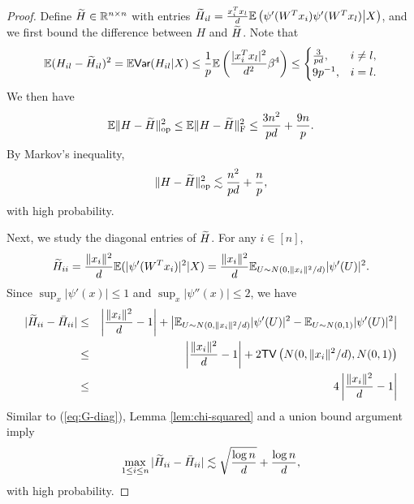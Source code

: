 \begin{proof}
Define $\widetilde{H}\in\mathbb{R}^{n\times n}$ with entries $\widetilde{H}_{il}=\frac{x_i^Tx_l}{d}\mathbb{E}\left(\psi'(W^Tx_i)\psi'(W^Tx_l)\big|X\right)$, and we first bound the difference between $H$ and $\widetilde{H}$. Note that
$$\mathbb{E}(H_{il}-\wt{H}_{il})^2=\mathbb{E}\Var(H_{il}|X)\leq \frac{1}{p}\mathbb{E}\left(\frac{|x_i^Tx_l|^2}{d^2}\beta^4\right)\leq\begin{cases}
\frac{3}{pd}, & i\neq l, \\
9p^{-1}, & i=l.
\end{cases}$$
We then have
$$\mathbb{E}\|H-\widetilde{H}\|_{\rm op}^2 \leq \mathbb{E}\|H-\widetilde{H}\|_{\rm F}^2 \leq \frac{3n^2}{pd} + \frac{9n}{p}.$$
By Markov's inequality,
\begin{equation}
\opnorm{H-\wt{H}}^2 \lesssim \frac{n^2}{pd} + \frac{n}{p}, \label{eq:H-H-tilde}
\end{equation}
with high probability.

Next, we study the diagonal entries of $\widetilde{H}$. For any $i\in[n]$,
$$\widetilde{H}_{ii}=\frac{\|x_i\|^2}{d}\mathbb{E}(|\psi'(W^Tx_i)|^2|X)=\frac{\|x_i\|^2}{d}\mathbb{E}_{U\sim N(0,\|x_i\|^2/d)}|\psi'(U)|^2.$$
Since $\sup_x|\psi'(x)|\leq 1$ and $\sup_x|\psi''(x)|\leq 2$, we have
\begin{eqnarray*}
|\wt{H}_{ii} - \bar{H}_{ii}| &\leq& \left|\frac{\|x_i\|^2}{d}-1\right| + \left|\mathbb{E}_{U\sim N(0,\|x_i\|^2/d)}|\psi'(U)|^2 - \mathbb{E}_{U\sim N(0,1)}|\psi'(U)|^2\right| \\
&\leq& \left|\frac{\|x_i\|^2}{d}-1\right| + 2\TV\left(N(0,\|x_i\|^2/d), N(0,1)\right) \\
&\leq& 4\left|\frac{\|x_i\|^2}{d}-1\right|
\end{eqnarray*}
Similar to (\ref{eq:G-diag}), Lemma \ref{lem:chi-squared} and a union bound argument imply
\begin{equation}
\max_{1\leq i\leq n}|\wt{H}_{ii}-\bar{H}_{ii}|\lesssim \sqrt{\frac{\log n}{d}}+\frac{\log n}{d}, \label{eq:H-diag}
\end{equation}
with high probability.


\end{proof}
